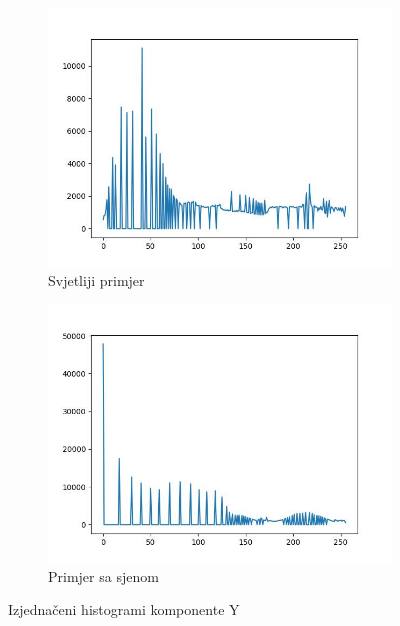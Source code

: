 \documentclass[times, utf8, diplomski]{fer}
\begin{document}
\begin{figure}[H]
\begin{subfigure}[b]{0.4\textwidth}
         \includegraphics[width=\textwidth]{figures/ce_examples/3/hist_eq.jpg}
         \caption{Svjetliji primjer}
     \end{subfigure}
     \begin{subfigure}[b]{0.4\textwidth}
         \centering
         \includegraphics[width=\textwidth]{figures/ce_examples/4/hist_eq.jpg}
         \caption{Primjer sa sjenom}
     \end{subfigure}
        \caption{Izjednačeni histogrami komponente Y}
        \label{fig:ce_hist_eq}
\end{figure}
\end{document}
